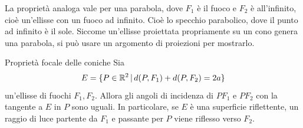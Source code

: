 \documentclass[a4paper]{article}
\begin{document}
La proprietà analoga vale
per una parabola, dove \(F_1\) è il fuoco e \(F_2\) è all'infinito, cioè un'ellisse con un fuoco ad infinito.
Cioè lo specchio parabolico, dove il punto ad infinito è il sole.
Siccome un'ellisse proiettata propriamente su un cono genera una parabola, si può
usare un argomento di proiezioni per mostrarlo.



\begin{snippetproposition}{Proprietà focale delle coniche}
    Sia
    \[
        E = \{ P \in \mathbb{R}^2 \,|\, d(P, F_1) + d(P, F_2) = 2a \}
    \]
    un'ellisse di fuochi \(F_1,F_2\). Allora gli angoli di incidenza di \(PF_1\)
    e \(PF_2\) con la tangente a \(E\) in \(P\) sono uguali. In particolare,
    se \(E\) è una superficie riflettente, un raggio di luce partente da \(F_1\)
    e passante per \(P\) viene riflesso verso \(F_2\).
\end{snippetproposition}
\end{document}
